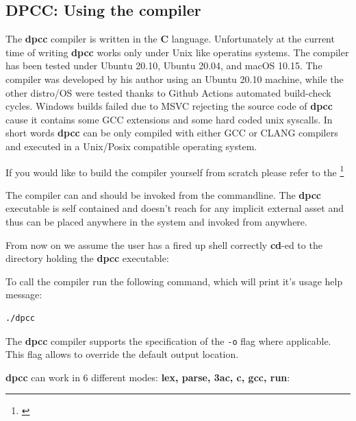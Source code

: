 \documentclass[a4paper]{article}
\newcommand{\urlref}[3][blue]{\href{#2}{\color{#1}{#3}}}%
\begin{document}
\subsection{DPCC: Using the compiler}

The \textbf{dpcc} compiler is written in the \textbf{C} language. Unfortunately at the current time
of writing \textbf{dpcc} works only under Unix like operatins systems. The compiler has
been tested under Ubuntu 20.10, Ubuntu 20.04, and macOS 10.15. The
compiler was developed by his author using an Ubuntu 20.10 machine, while the other distro/OS
were tested thanks to Github Actions automated build-check cycles. Windows builds
failed due to MSVC rejecting the source code of \textbf{dpcc} cause it contains some GCC
extensions and some hard coded unix syscalls.
In short words \textbf{dpcc} can be only compiled with either GCC or CLANG compilers
and executed in a Unix/Posix compatible operating system.

If you would like to build the compiler yourself from scratch please refer to the \urlref{https://github.com/dparo/dpcc/wiki}{Project WIKI}\footnote{\urlref{https://github.com/dparo/dpcc}{Github Repo Link}}

The compiler can and should be invoked from the commandline. The \textbf{dpcc} executable
is self contained and doesn't reach for any implicit external asset and thus can be placed
anywhere in the system and invoked from anywhere.

From now on we assume the user has a fired up shell correctly \textbf{cd}-ed to the directory
holding the \textbf{dpcc} executable:

To call the compiler run the following command, which will print it's usage help message:

\begin{lstlisting}[language=Bash]
./dpcc
\end{lstlisting}

The \textbf{dpcc} compiler supports the specification of the \texttt{-o} flag
where applicable. This flag allows to override the default output location.

\textbf{dpcc} can work in 6 different modes: \textbf{lex, parse, 3ac, c, gcc, run}:
\end{document}
